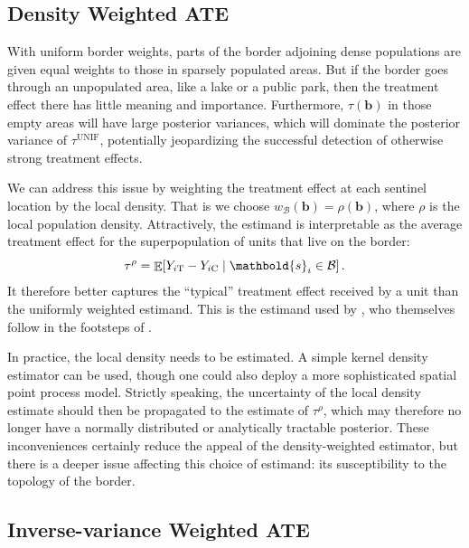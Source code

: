 \documentclass[letter,12pt]{article}
\DeclarePairedDelimiter{\squarebracket}{\lbrack}{\rbrack}
\newcommand{\sbr}[1]{\squarebracket*{#1}}
\DeclareMathOperator{\E}{\mathbb{E}}
\newcommand{\treat}{\mathrm{T}}
\newcommand{\ctrol}{\mathrm{C}}
\newcommand{\svec}{\mathbold{s}}
\newcommand{\border}{\mathcal{B}}
\newcommand{\sentinel}{\bm{b}}
\newcommand{\unifavg}{\tau^{\mathrm{UNIF}}}
\newcommand{\taurho}{\tau^{\rho}}
\newcommand{\weightb}{w_{\border}}
\begin{document}
\hypertarget{density-weighted-ate}{%
\subsection{Density Weighted ATE}\label{density-weighted-ate}}

\label{sec:tau_rho}



With uniform border weights, parts of the border adjoining dense populations are given equal weights to those in sparsely populated areas.
But if the border goes through an unpopulated area, like a lake or a public park, then the treatment effect there has little meaning and importance.
Furthermore, \(\tau(\sentinel)\) in those empty areas will have large posterior variances, which will dominate the posterior variance of \(\unifavg\), potentially jeopardizing the successful detection of otherwise strong treatment effects.

We can address this issue by weighting the treatment effect at each sentinel location by the local density.
That is we choose \(\weightb(\sentinel) = \rho(\sentinel)\), where \(\rho\) is the local population density.
Attractively, the estimand is interpretable as the average treatment effect for the superpopulation of units that live on the border:
\begin{equation}
    \taurho = \E\sbr{Y_{i\treat} - Y_{i\ctrol} \mid \svec_i \in \border}\,.
\end{equation}
It therefore better captures the ``typical'' treatment effect received by a unit than the uniformly weighted estimand.
This is the estimand used by \cite{keele_titiunik_2015}, who themselves follow in the footsteps of \cite{imbens2011regression}.

In practice, the local density needs to be estimated.
A simple kernel density estimator can be used,
though one could also deploy a more sophisticated spatial point process model.
Strictly speaking, the uncertainty of the local density estimate should then be propagated to the estimate of \(\taurho\), which may therefore no longer have a normally distributed or analytically tractable posterior.
These inconveniences certainly reduce the appeal of the density-weighted estimator,
but there is a deeper issue affecting this choice of estimand: its susceptibility to the topology of the border.



\hypertarget{inverse-variance-weighted-ate}{%
\subsection{Inverse-variance Weighted ATE}\label{inverse-variance-weighted-ate}}
\end{document}
